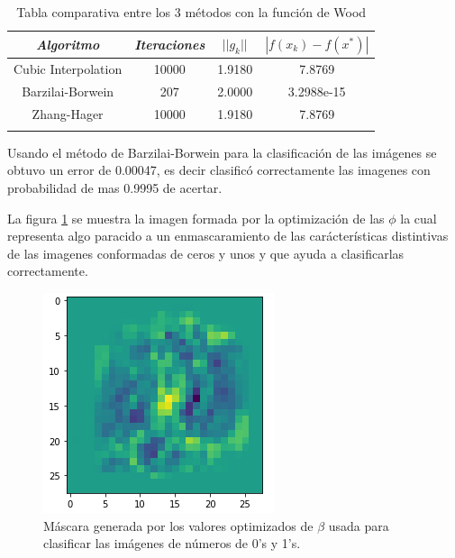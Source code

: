 \documentclass[conference]{IEEEtran}
\begin{document}
\begin{table}[htbp]
    \caption{Tabla comparativa entre los 3 métodos con la función de Wood}
    \begin{center}
        \begin{tabular}{|c|c|c|c|}
            \hline
			\textbf{\textit{Algoritmo}}& \textbf{\textit{Iteraciones}}& \textbf{\textit{$||g_k||$}}& \textbf{\textit{$|f(x_k) - f(x^*)|$}} \\

            \hline
            Cubic Interpolation& 10000 & 1.9180 & 7.8769 \\
            Barzilai-Borwein& 207 & 2.0000 & 3.2988e-15 \\
            Zhang-Hager& 10000 & 1.9180 & 7.8769 \\
            \hline
            \multicolumn{4}{l}{}
        \end{tabular}
        \label{tab2}
    \end{center}
\end{table}

Usando el método de Barzilai-Borwein para la clasificación de las imágenes se obtuvo un error de
0.00047, es decir clasificó correctamente las imagenes con probabilidad de mas 0.9995 de acertar.

La figura \ref{f2} se muestra la imagen formada por la optimización de las $\phi$ la cual representa
algo paracido a un enmascaramiento de las carácterísticas distintivas de las imagenes conformadas de
ceros y unos y que ayuda a clasificarlas correctamente.


\begin{figure}[htbp]
    \centerline{\includegraphics[scale=0.6]{2.png}}
    \caption{Máscara generada por los valores optimizados de $\beta$ usada para clasificar las imágenes de números de 0's y 1's.}
    \label{f2}
\end{figure}
\end{document}
